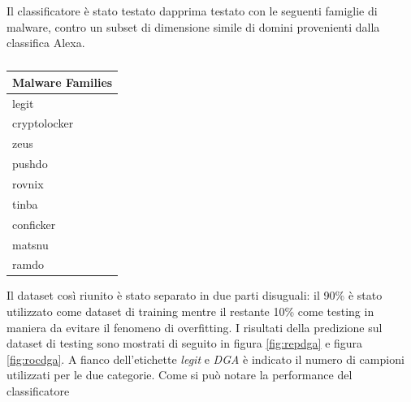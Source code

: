 Il classificatore è stato testato dapprima testato con le seguenti famiglie di malware, contro un subset di dimensione simile di domini provenienti dalla classifica Alexa.

\begin{table}[!ht]
    \centering
    \begin{tabular}[t]{l}
    \toprule
    Malware Families \\
    \midrule
legit \\
cryptolocker \\
zeus \\
pushdo \\
rovnix \\
tinba \\
conficker \\
matsnu \\
ramdo \\
\bottomrule
\end{tabular}
\caption{\label{tab:malware}}
\end{table}

Il dataset così riunito è stato separato in due parti disuguali: il 90\% è stato utilizzato come dataset di training mentre il restante 10\% come testing in maniera da evitare il fenomeno di overfitting. I risultati della predizione sul dataset di testing sono mostrati di seguito in figura \ref{fig:repdga} e figura \ref{fig:rocdga}. A fianco dell'etichette \textit{legit} e \textit{DGA} è indicato il numero di campioni utilizzati per le due categorie. Come si può notare la performance del classificatore

